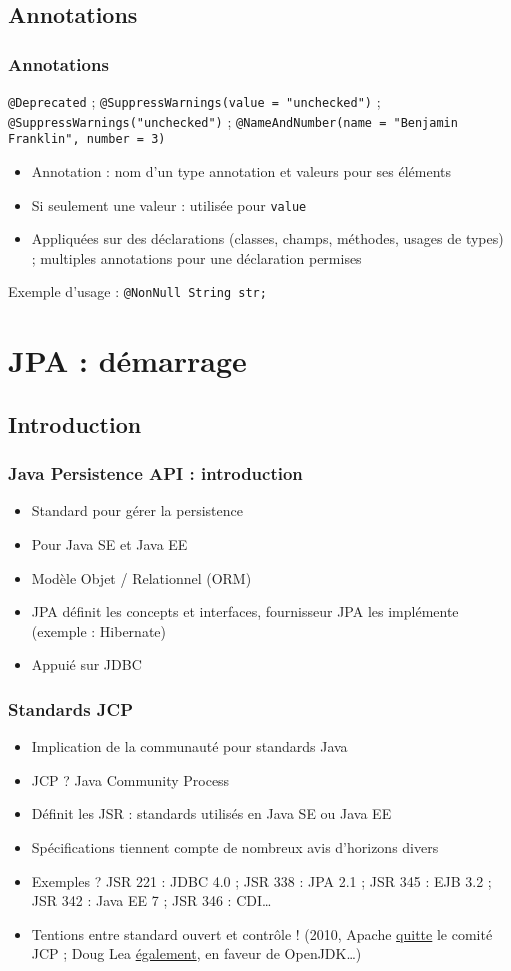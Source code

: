 \documentclass[english, french]{beamer}
\begin{document}
\subsection{Annotations}
\begin{frame}
	\frametitle{Annotations}
	\texttt{@Deprecated} ; \texttt{@SuppressWarnings(value = "unchecked")} ; \texttt{@SuppressWarnings("unchecked")} ; \texttt{@NameAndNumber(name = "Benjamin Franklin", number = 3)}
	\begin{itemize}
		\item Annotation : nom d’un type annotation et valeurs pour ses éléments
		\item Si seulement une valeur : utilisée pour \texttt{value}
		\item Appliquées sur des déclarations (classes, champs, méthodes, usages de types) ; multiples annotations pour une déclaration permises
	\end{itemize}
	Exemple d’usage : \texttt{@NonNull String str;}
\end{frame}

\section{JPA : démarrage}
\subsection{Introduction}
\begin{frame}
	\frametitle{Java Persistence API : introduction}
	\begin{itemize}
		\item Standard pour gérer la persistence
		\item Pour Java SE et Java EE
		\item Modèle Objet / Relationnel (ORM)
		\item JPA définit les concepts et interfaces, fournisseur JPA les implémente (exemple : Hibernate)
		\item Appuié sur JDBC
	\end{itemize}
\end{frame}

\begin{frame}
	\frametitle{Standards JCP}
	\begin{itemize}
		\item Implication de \og{}la communauté\fg{} pour standards Java
		\item JCP ? \pause Java Community Process \pause
		\item Définit les JSR : standards utilisés en Java SE ou Java EE
		\item Spécifications tiennent compte de nombreux avis d’horizons divers
		\item Exemples ? \pause JSR 221 : JDBC 4.0 ; JSR 338 : JPA 2.1 ; JSR 345 : EJB 3.2 ; JSR 342 : Java EE 7 ; JSR 346 : CDI… \pause
		\item Tentions entre standard ouvert et contrôle ! (2010, Apache \href{https://blogs.apache.org/foundation/entry/the_asf_resigns_from_the}{quitte} le comité JCP ; Doug Lea \href{http://gee.cs.oswego.edu/dl/html/jcp22oct10.html}{également}, en faveur de OpenJDK…)
	\end{itemize}
\end{frame}
\end{document}
